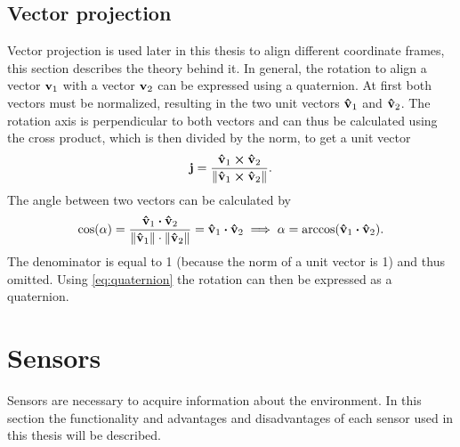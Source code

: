 \subsection{Vector projection}
\label{subsec:vector_projection}
Vector projection is used later in this thesis to align different coordinate frames, this section describes the theory behind it.
In general, the rotation to align a vector $\vb{v}_1$ with a vector $\vb{v}_2$ can be expressed using a quaternion.
At first both vectors must be normalized, resulting in the two unit vectors $\vu{v}_1$ and $\vu{v}_2$.
The rotation axis is perpendicular to both vectors and can thus be calculated using the cross product, which is then divided by the norm, to get a unit vector
\begin{equation}
	\vb{j} = \frac{\vu{v}_1 \cp \vu{v}_2}{\norm{\vu{v}_1 \cp \vu{v}_2}}.
\end{equation}
The angle between two vectors can be calculated by
\begin{equation}
	\cos(\alpha) = \frac{\vu{v}_1 \vdot \vu{v}_2}{\norm{\vu{v}_1} \cdot \norm{\vu{v}_2}}
	= \vu{v}_1 \vdot \vu{v}_2 \implies
	\alpha = \arccos(\vu{v}_1 \vdot \vu{v}_2).
\end{equation}
The denominator is equal to 1 (because the norm of a unit vector is 1) and thus omitted.
Using \cref{eq:quaternion} the rotation can then be expressed as a quaternion.



\section{Sensors}
\label{sec:sensors}
Sensors are necessary to acquire information about the environment.
In this section the functionality and advantages and disadvantages of each sensor used in this thesis will be described.

